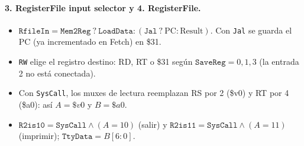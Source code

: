 \documentclass[11pt,a4paper]{article}
\newcommand{\sig}[1]{\texttt{#1}}
\begin{document}
\paragraph{3. RegisterFile input selector y 4. RegisterFile.}
\begin{itemize}
  \item $\sig{RfileIn}=\sig{Mem2Reg}\ ?\ \sig{LoadData} : (\sig{Jal}\ ?\ \mathrm{PC} : \mathrm{Result})$. Con \sig{Jal} se guarda el PC (ya incrementado en Fetch) en \$31.
  \item \sig{RW} elige el registro destino: RD, RT o \$31 seg\'un $\sig{SaveReg}=0,1,3$ (la entrada 2 no est\'a conectada).
  \item Con \sig{SysCall}, los muxes de lectura reemplazan RS por 2 (\$v0) y RT por 4 (\$a0): as\'i $A=\$v0$ y $B=\$a0$.
  \item $\sig{R2is10}=\sig{SysCall}\land(A=10)$ (salir) y $\sig{R2is11}=\sig{SysCall}\land(A=11)$ (imprimir); $\sig{TtyData}=B[6{:}0]$.
\end{itemize}
\end{document}
